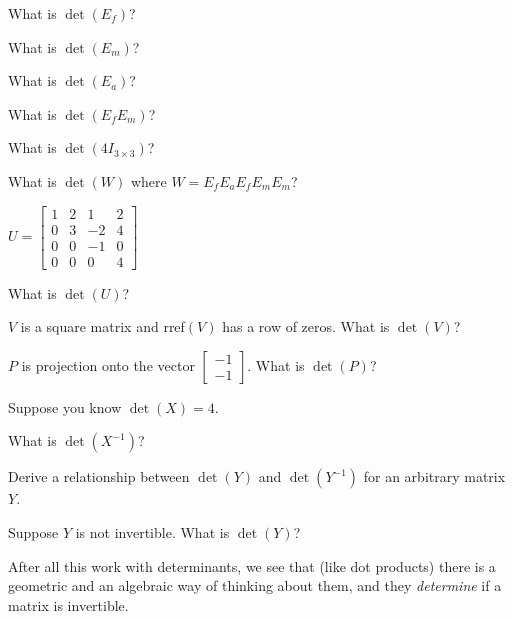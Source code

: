 \documentclass{problemset}
\newcommand{\mat}[1]{\begin{bmatrix}#1\end{bmatrix}}
\begin{document}
	\begin{parts}
		\item What is $\det(E_f)$?
		\item What is $\det(E_m)$?
		\item What is $\det(E_a)$?
		\item What is $\det(E_fE_m)$?
		\item What is $\det(4I_{3\times 3})$?
		\item What is $\det(W)$ where $W=E_fE_aE_fE_mE_m$?
	\end{parts}

	\question
	$U=\mat{1&2&1&2\\0&3&-2&4\\0&0&-1&0\\0&0&0&4}$
	\begin{parts}
		\item What is $\det(U)$?
		\item $V$ is a square matrix and rref$(V)$ has a row of zeros.
		 What is $\det(V)$?
		\item $P$ is projection onto the vector $\mat{-1\\-1}$. What is $\det(P)$?
	\end{parts}

	\question
	Suppose you know $\det(X)=4$.
	\begin{parts}
		\item What is $\det(X^{-1})$?
		\item Derive a relationship between $\det(Y)$
			and $\det(Y^{-1})$ for an arbitrary matrix $Y$.
		\item Suppose $Y$ is not invertible.  What is $\det(Y)$?
	\end{parts}

	After all this work with determinants, we see 
	that (like dot products) there is a geometric and an
	algebraic way of thinking about them, and they 
	\emph{determine} if a matrix is invertible.
\end{document}
